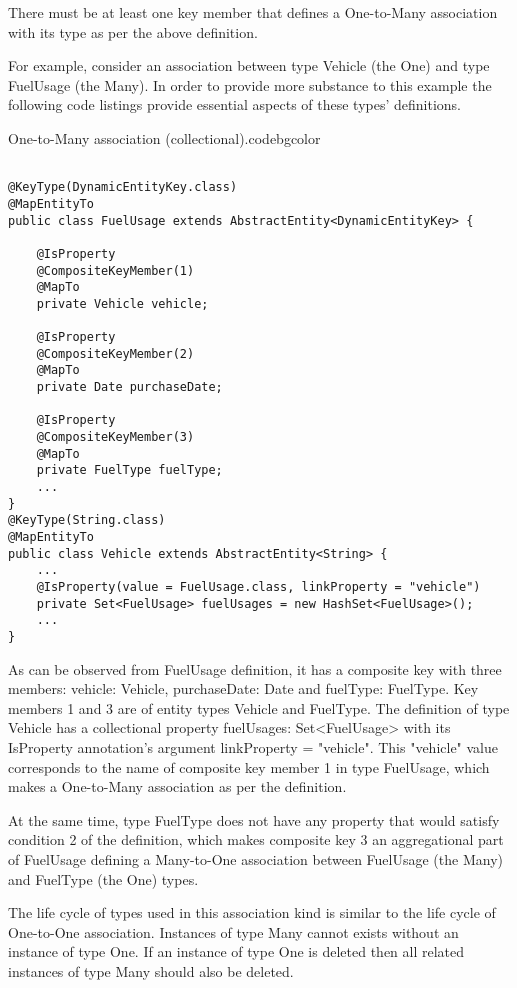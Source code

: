   There must be at least one key member that defines a One-to-Many association with its type as per the above definition.

  For example, consider an association between type Vehicle (the One) and type FuelUsage (the Many). In order to provide more substance to this example the following code listings provide essential aspects of these types' definitions.

  \begin{code}{One-to-Many association (collectional).}{\label{lst:One2Many}}{codebgcolor}
    \begin{lstlisting}

@KeyType(DynamicEntityKey.class)
@MapEntityTo
public class FuelUsage extends AbstractEntity<DynamicEntityKey> {

    @IsProperty
    @CompositeKeyMember(1)
    @MapTo
    private Vehicle vehicle;
    
    @IsProperty
    @CompositeKeyMember(2)
    @MapTo
    private Date purchaseDate;
    
    @IsProperty
    @CompositeKeyMember(3)
    @MapTo
    private FuelType fuelType;
    ...
}
@KeyType(String.class)
@MapEntityTo
public class Vehicle extends AbstractEntity<String> {
    ...
    @IsProperty(value = FuelUsage.class, linkProperty = "vehicle")
    private Set<FuelUsage> fuelUsages = new HashSet<FuelUsage>();   
    ...
} 
    \end{lstlisting}
  \end{code}

  As can be observed from FuelUsage definition, it has a composite key with three members: vehicle: Vehicle, purchaseDate: Date and fuelType: FuelType. Key members 1 and 3 are of entity types Vehicle and FuelType. The definition of type Vehicle has a collectional property fuelUsages: Set<FuelUsage> with its IsProperty annotation's argument linkProperty = "vehicle". This "vehicle" value corresponds to the name of composite key member 1 in type FuelUsage, which makes a One-to-Many association as per the definition.

  At the same time, type FuelType does not have any property that would satisfy condition 2 of the definition, which makes composite key 3 an aggregational part of FuelUsage defining a Many-to-One association between FuelUsage (the Many) and FuelType (the One) types.

  The life cycle of types used in this association kind is similar to the life cycle of One-to-One association. Instances of type Many cannot exists without an instance of type One. If an instance of type One is deleted then all related instances of type Many should also be deleted.

